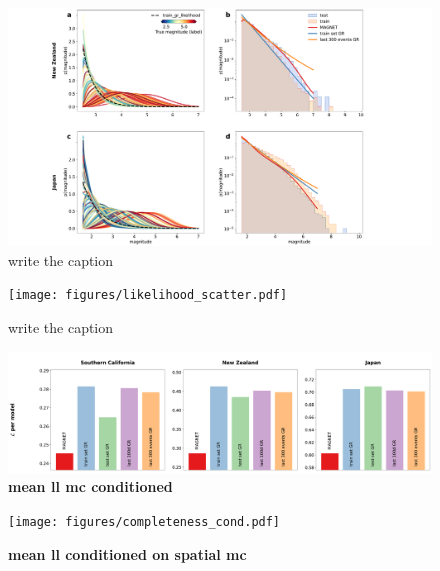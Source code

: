 \documentclass[pdflatex]{sn-jnl}
\begin{document}
\newpage
\begin{figure}[h!]
    \centering
    \includegraphics[width=1\textwidth]{figures/raw_results_em.pdf}
    \caption{
        write the caption
    }
    \label{fig:model_output_em}
\end{figure}

\newpage
\begin{figure}[h!]
    \centering
    \texttt{[image: figures/likelihood\_scatter.pdf]}
    \caption{
        write the caption
    }
    \label{fig:labels_likelihood}
\end{figure}

\newpage
\begin{figure}[h!]
    \centering
    \includegraphics[width=1\textwidth]{figures/combined_barplots_conditioned.pdf}
    \caption{
        \textbf{mean ll mc conditioned}
    }
    \label{fig:mean_ll_mc_conditioned}
\end{figure}


\newpage
\begin{figure}[h!]
    \centering
    \texttt{[image: figures/completeness\_cond.pdf]}
    \caption{
        \textbf{mean ll conditioned on spatial mc}
    }
    \label{fig:mean_ll_conditioned_spatial_mc}
\end{figure}
\end{document}
